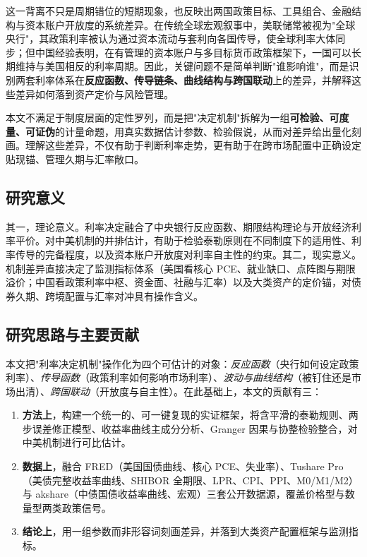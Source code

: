 \documentclass[12pt,a4paper]{ctexart}
\begin{document}
这一背离不只是周期错位的短期现象，也反映出两国政策目标、工具组合、金融结构与资本账户开放度的系统差异。在传统全球宏观叙事中，美联储常被视为"全球央行"，其政策利率被认为通过资本流动与套利向各国传导，使全球利率大体同步；但中国经验表明，在有管理的资本账户与多目标货币政策框架下，一国可以长期维持与美国相反的利率周期。因此，关键问题不是简单判断"谁影响谁"，而是识别两套利率体系在\textbf{反应函数、传导链条、曲线结构与跨国联动}上的差异，并解释这些差异如何落到资产定价与风险管理。

本文不满足于制度层面的定性罗列，而是把"决定机制"拆解为一组\textbf{可检验、可度量、可证伪}的计量命题，用真实数据估计参数、检验假说，从而对差异给出量化刻画。理解这些差异，不仅有助于判断利率走势，更有助于在跨市场配置中正确设定贴现锚、管理久期与汇率敞口。

\subsection{研究意义}
其一，理论意义。利率决定融合了中央银行反应函数、期限结构理论与开放经济利率平价。对中美机制的并排估计，有助于检验泰勒原则在不同制度下的适用性、利率传导的完备程度，以及资本账户开放度对利率自主性的约束。其二，现实意义。机制差异直接决定了监测指标体系（美国看核心 PCE、就业缺口、点阵图与期限溢价；中国看政策利率中枢、资金面、社融与汇率）以及大类资产的定价锚，对债券久期、跨境配置与汇率对冲具有操作含义。

\subsection{研究思路与主要贡献}
本文把"利率决定机制"操作化为四个可估计的对象：\emph{反应函数}（央行如何设定政策利率）、\emph{传导函数}（政策利率如何影响市场利率）、\emph{波动与曲线结构}（被钉住还是市场出清）、\emph{跨国联动}（开放度与自主性）。在此基础上，本文的贡献有三：

\begin{enumerate}[leftmargin=2em]
\item \textbf{方法上}，构建一个统一的、可一键复现的实证框架，将含平滑的泰勒规则、两步误差修正模型、收益率曲线主成分分析、Granger 因果与协整检验整合，对中美机制进行可比估计。
\item \textbf{数据上}，融合 FRED（美国国债曲线、核心 PCE、失业率）、Tushare Pro（美债完整收益率曲线、SHIBOR 全期限、LPR、CPI、PPI、M0/M1/M2）与 akshare（中债国债收益率曲线、宏观）三套公开数据源，覆盖价格型与数量型两类政策信号。
\item \textbf{结论上}，用一组参数而非形容词刻画差异，并落到大类资产配置框架与监测指标。
\end{enumerate}
\end{document}
